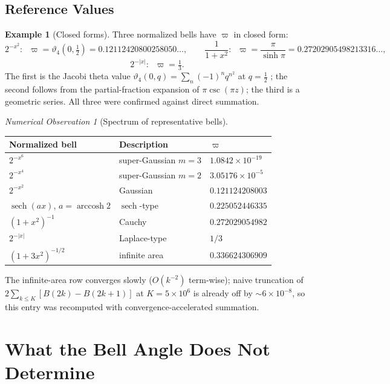 \documentclass[11pt]{article}
\theoremstyle{definition}
\newtheorem{example}[definition]{Example}
\theoremstyle{plain}
\theoremstyle{remark}
\newtheorem{observation}[definition]{Numerical Observation}
\begin{document}
\subsection{Reference Values}

\begin{example}[Closed forms]\label{ex:closed}
Three normalized bells have $\varpi$ in closed form:
\[
2^{-x^2}:\;\;\varpi=\vartheta_4\!\left(0,\tfrac12\right)=0.12112420800258050\ldots,
\qquad
\frac{1}{1+x^2}:\;\;\varpi=\frac{\pi}{\sinh\pi}=0.27202905498213316\ldots,
\]
\[
2^{-|x|}:\;\;\varpi=\tfrac13 .
\]
The first is the Jacobi theta value $\vartheta_4(0,q)=\sum_n(-1)^nq^{n^2}$ at
$q=\tfrac12$ \cite{DLMF}; the second follows from the partial-fraction expansion of $\pi\csc(\pi z)$;
the third is a geometric series. All three were confirmed against direct summation.
\end{example}

\begin{observation}[Spectrum of representative bells]\label{obs:spectrum}
\begin{center}
\begin{tabular}{@{}lll@{}}
\toprule
Normalized bell & Description & $\varpi$\\
\midrule
$2^{-x^{6}}$ & super-Gaussian $m=3$ & $1.0842\times10^{-19}$\\
$2^{-x^{4}}$ & super-Gaussian $m=2$ & $3.05176\times10^{-5}$\\
$2^{-x^{2}}$ & Gaussian & $0.121124208003$\\
$\operatorname{sech}(ax)$, $a=\operatorname{arccosh}2$ & $\operatorname{sech}$-type & $0.225052446335$\\
$\left(1+x^{2}\right)^{-1}$ & Cauchy & $0.272029054982$\\
$2^{-|x|}$ & Laplace-type & $1/3$\\
$\left(1+3x^{2}\right)^{-1/2}$ & infinite area & $0.336624306909$\\
\bottomrule
\end{tabular}
\end{center}
The infinite-area row converges slowly ($O(k^{-2})$ term-wise); naive truncation of
$2\sum_{k\le K}[B(2k)-B(2k+1)]$ at $K=5\times10^6$ is already off by $\sim6\times10^{-8}$,
so this entry was recomputed with convergence-accelerated summation.
\end{observation}

 
\section{What the Bell Angle Does Not Determine}\label{sec:notdetermine}
 
\end{document}
